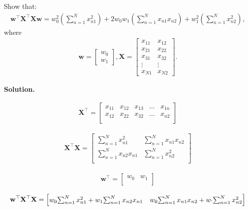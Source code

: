 \documentclass[10pt]{article}
\begin{document}
\begin{enumerate}
Show that:
\begin{eqnarray*}
\mathbf{w}^\top\mathbf{X}^\top\mathbf{X}\mathbf{w} = w_0^2 \left( \sum_{n=1}^N x_{n1}^2 \right) + 2w_0w_1 \left( \sum_{n=1}^N x_{n1}x_{n2} \right) + w_1^2 \left( \sum_{n=1}^N x_{n2}^2 \right),
\end{eqnarray*}
where
\begin{eqnarray*}
\mathbf{w} = 
    \begin{bmatrix}
    w_0 \\[0.3em]
    w_1
    \end{bmatrix}
    ,
\mathbf{X} = 
    \begin{bmatrix}
    x_{11} & x_{12} \\[0.3em]
    x_{21} & x_{22} \\[0.3em]
    x_{31} & x_{32} \\[0.3em]
    \vdots & \vdots \\[0.3em]
    x_{N1} & x_{N2}
    \end{bmatrix}
    .
\end{eqnarray*}

{\bf Solution.}

\begin{eqnarray*}
\mathbf{X}^\top = 
    \begin{bmatrix}
    x_{11} & x_{12} & x_{13} & \dots & x_{1n} \\[0.3em]
    x_{12} & x_{22} & x_{32} & \dots & x_{n2} \\[0.3em]
    \end{bmatrix}
\end{eqnarray*}


\begin{eqnarray*}
\mathbf{X}^\top\mathbf{X} = 
    \begin{bmatrix}
    {\sum_{n=1}^N x_{n1}^2}      & {\sum_{n=1}^N x_{n1} x_{n2}} \\[0.3em]
    {\sum_{n=1}^N x_{n2} x_{n1}} & {\sum_{n=1}^N x_{n2}^2}      \\[0.3em]
    \end{bmatrix}
\end{eqnarray*}

\begin{eqnarray*}
\mathbf{w}^\top = 
    \begin{bmatrix}
    w_0 & w_1 \\[0.3em]
    \end{bmatrix}
\end{eqnarray*}


\begin{eqnarray*}
\mathbf{w}^\top\mathbf{X}^\top\mathbf{X} = 
	\begin{bmatrix}
	w_0{\sum_{n=1}^N x_{n1}^2} + w_1{\sum_{n=1}^N x_{n2} x_{n1}} & w_0{\sum_{n=1}^N x_{n1} x_{n2} + w_`{\sum_{n=1}^N x_{n2}^2}}
	\end{bmatrix}
\end{eqnarray*}


\end{enumerate}
\end{document}
